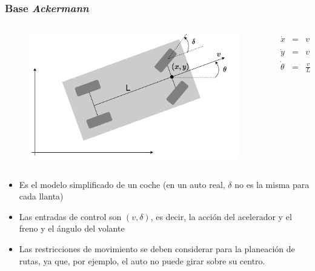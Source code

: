 \begin{frame}\frametitle{Base \textit{Ackermann}}
  \begin{columns}
    \begin{column}{0.7\textwidth}
      \begin{figure}
        \centering
        \includegraphics[height=0.5\textheight]{Figures/AckermannBase.pdf}
      \end{figure}
    \end{column}
    \begin{column}{0.3\textwidth}
      \begin{eqnarray*}
        \dot{x} &=& v\cos(\theta + \delta)\\
        \dot{y} &=& v\sin(\theta + \delta)\\
        \dot{\theta} &=& \frac{v}{L}\sin(\delta)
      \end{eqnarray*}
    \end{column}
  \end{columns}
  \begin{itemize}
  \item Es el modelo simplificado de un coche (en un auto real, $\delta$ no es la misma para cada llanta)
  \item Las entradas de control son $(v,\delta)$, es decir, la acción del acelerador y el freno y el ángulo del volante
  \item Las restricciones de movimiento se deben considerar para la planeación de rutas, ya que, por ejemplo, el auto no puede girar sobre su centro. 
  \end{itemize}
\end{frame}

